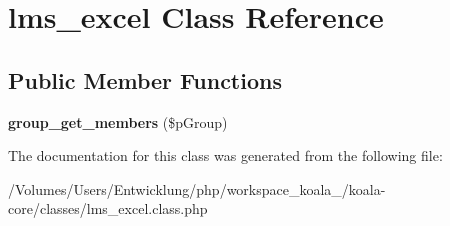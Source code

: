\hypertarget{classlms__excel}{
\section{lms\_\-excel Class Reference}
\label{classlms__excel}
}
\subsection*{Public Member Functions}
\begin{DoxyCompactItemize}
\item 
\hypertarget{classlms__excel_a751426a068ff3492176455feae04cc1f}{
{\bfseries group\_\-get\_\-members} (\$pGroup)}
\label{classlms__excel_a751426a068ff3492176455feae04cc1f}

\end{DoxyCompactItemize}


The documentation for this class was generated from the following file:\begin{DoxyCompactItemize}
\item 
/Volumes/Users/Entwicklung/php/workspace\_\-koala\_/koala-\/core/classes/lms\_\-excel.class.php\end{DoxyCompactItemize}

